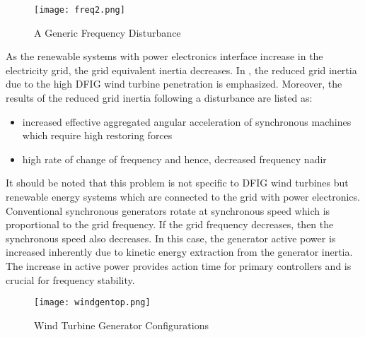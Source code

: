 \begin{figure}[h!]
	\centering
	\texttt{[image: freq2.png]}
	\caption{A Generic Frequency Disturbance}
	\label{freq2}
\end{figure}
As the renewable systems with power electronics interface increase in the electricity grid, the grid equivalent inertia decreases. In \cite{Gautam2011}, the reduced grid inertia due to the high DFIG wind turbine penetration is emphasized. Moreover, the results of the reduced grid inertia following a disturbance are listed as: 
\begin{itemize}
	\item increased effective aggregated angular acceleration of synchronous machines which require high restoring forces
	\item high rate of change of frequency and hence, decreased frequency nadir
\end{itemize}
It should be noted that this problem is not specific to DFIG wind turbines but renewable energy systems which are connected to the grid with power electronics. Conventional synchronous generators rotate at synchronous speed which is proportional to the grid frequency. If the grid frequency decreases, then the synchronous speed also decreases. In this case, the generator active power is increased inherently due to kinetic energy extraction from the generator inertia. The increase in active power provides action time for primary controllers and is crucial for frequency stability. \par
\begin{figure}[h!]
	\centering
	\texttt{[image: windgentop.png]}
	\caption{Wind Turbine Generator Configurations \cite{Muljadi2012}}
	\label{windtop}
\end{figure}
